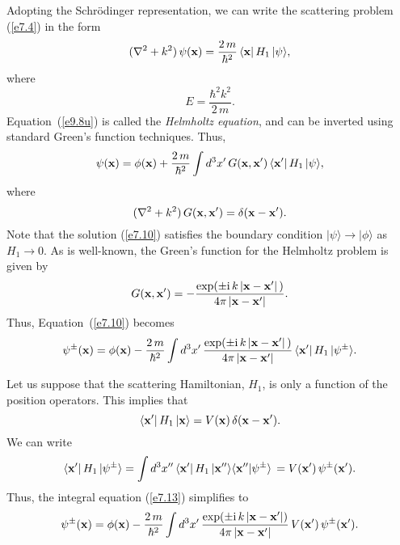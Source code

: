 Adopting the Schr\"{o}dinger representation, we can write the scattering
problem (\ref{e7.4}) in the form
\begin{equation}\label{e9.8u}
(\nabla^2 + k^2)\,\psi({\bf x}) = \frac{2\,m}{\hbar^2}\, \langle {\bf x} |\,H_1\,|
\psi\rangle,
\end{equation}
where
\begin{equation}
E = \frac{\hbar^2 k^2}{2\,m}.
\end{equation}
Equation~(\ref{e9.8u})  is called the {\em Helmholtz equation}, and can be inverted
using standard Green's function techniques. Thus,
\begin{equation}\label{e7.10}
\psi({\bf x}) = \phi({\bf x}) + \frac{2\,m}{\hbar^2} \int d^3 x'\,G({\bf x}, {\bf x}')
\,\langle {\bf x}' |\,H_1\,|\psi\rangle,
\end{equation}
where
\begin{equation}
(\nabla^2 + k^2)\,G({\bf x}, {\bf x}') = \delta({\bf x} -{\bf x}').
\end{equation}
Note that the solution (\ref{e7.10}) satisfies the boundary condition $|\psi\rangle
\rightarrow |\phi\rangle$ as $H_1\rightarrow 0$. 
As is well-known, the Green's function for the Helmholtz problem is
given by
\begin{equation}
G({\bf x}, {\bf x}') = -\frac{\exp(\pm {\rm i}\,k\,
|{\bf x} - {\bf x}'|\,)}{4\pi\,|{\bf x} - {\bf x}'|}.
\end{equation}
Thus, Equation~(\ref{e7.10}) becomes
\begin{equation}
\psi^\pm({\bf x}) = \phi({\bf x}) - \frac{2\,m}{\hbar^2} \int d^3 x'\,\frac{\exp(\pm {\rm i}\,k\,
|{\bf x} - {\bf x}'|\,)}{4\pi\,|{\bf x} - {\bf x}'|}\, \langle {\bf x}' |\,H_1\,|\psi^\pm\rangle.\label{e7.13}
\end{equation}

Let us suppose that the scattering Hamiltonian, $H_1$, is only a function
of the position operators. This implies that
\begin{equation}\label{e7.15}
\langle {\bf x}'|\,H_1\,|{\bf x}\rangle = V({\bf x})\, \delta({\bf x} -{\bf x}').
\end{equation}
 We can write
\begin{equation}
\langle {\bf x}'|\,H_1\,| \psi^\pm\rangle = \int d^3 x''\,\langle
{\bf x}'|\,H_1\,|{\bf x}''\rangle \langle {\bf x}'' |\psi^\pm\rangle\,
= V({\bf x}') \,\psi^\pm ({\bf x}').
\end{equation}
Thus, the integral equation (\ref{e7.13}) simplifies to
\begin{equation}\label{e7.17}
\psi^\pm({\bf x}) = \phi({\bf x}) - \frac{2\,m}{\hbar^2} \int d^3 x'\,\frac{\exp(\pm {\rm i}\,k\,
|{\bf x} - {\bf x}'|)}{4\pi\,|{\bf x} - {\bf x}'|}\, V({\bf x}')\,
\psi^\pm({\bf x}').
\end{equation}

